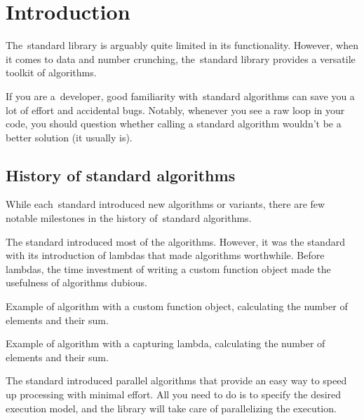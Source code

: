 \chapter{Introduction}

The \CC\,standard library is arguably quite limited in its functionality. However, when it comes to data and number crunching, the \CC\,standard library provides a versatile toolkit of algorithms.

If you are a \CC\,developer, good familiarity with \CC\,standard algorithms can save you a lot of effort and accidental bugs. Notably, whenever you see a raw loop in your code, you should question whether calling a standard algorithm wouldn't be a better solution (it usually is).

\section{History of standard \texorpdfstring{\CC}{C++} algorithms}

While each \CC\,standard introduced new algorithms or variants, there are few notable milestones in the history of \CC\,standard algorithms.

The  standard introduced most of the algorithms. However, it was the  standard with its introduction of lambdas that made algorithms worthwhile. Before lambdas, the time investment of writing a custom function object made the usefulness of algorithms dubious.

\raggedbottom
\begin{box-nobreak}
\footnotesize Example of  algorithm with a custom function object, calculating the number of elements and their sum.
\tcblower
{}
\end{box-nobreak}

\begin{box-note}
\footnotesize Example of  algorithm with a capturing lambda, calculating the number of elements and their sum.
\tcblower
{}
\end{box-note}

The  standard introduced parallel algorithms that provide an easy way to speed up processing with minimal effort. All you need to do is to specify the desired execution model, and the library will take care of parallelizing the execution.

